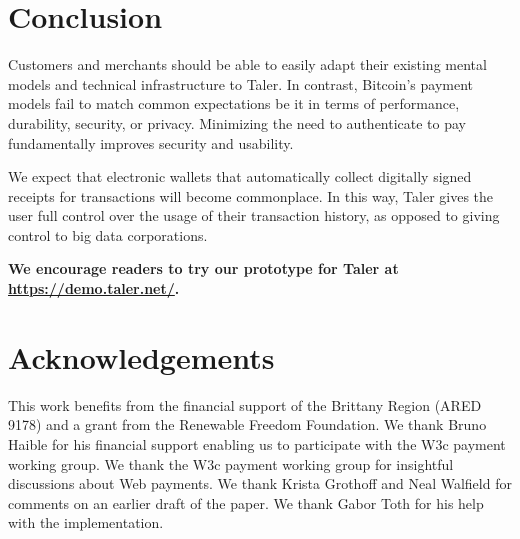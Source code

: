 \documentclass{llncs}
\begin{document}
\section{Conclusion}

Customers and merchants should be able to easily adapt their existing
mental models and technical infrastructure to Taler.  In contrast,
Bitcoin's payment models fail to match common expectations be it in
terms of performance, durability, security, or privacy.  Minimizing
the need to authenticate to pay fundamentally improves security
and usability.

We expect that electronic wallets that automatically collect digitally
signed receipts for transactions will become commonplace.
In this way, Taler gives the user full control over the usage of their
transaction history, as opposed to giving control to big data corporations.

\begin{center}
  \bf
We encourage readers to try our prototype for Taler
at \url{https://demo.taler.net/}.
\end{center}


\section*{Acknowledgements}

This work benefits from the financial support of the Brittany Region
(ARED 9178) and a grant from the Renewable Freedom Foundation.  We
thank Bruno Haible for his financial support enabling us to
participate with the W3c payment working group.  We thank the W3c
payment working group for insightful discussions about Web payments.
We thank Krista Grothoff and Neal Walfield for comments on an earlier
draft of the paper.  We thank Gabor Toth for his help with the
implementation.



\end{document}
